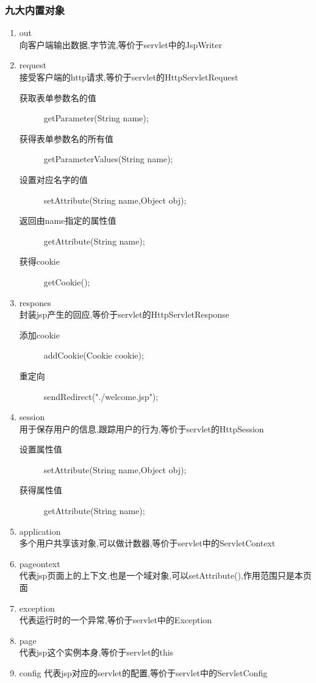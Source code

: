\subsubsection{九大内置对象}
\begin{enumerate}
\item out\\
向客户端输出数据,字节流,等价于servlet中的JspWriter

\item request\\
接受客户端的http请求,等价于servlet的HttpServletRequest
\begin{description}
\item[获取表单参数名的值]	getParameter(String name);
\item[获得表单参数名的所有值]	getParameterValues(String name);
\item[设置对应名字的值]		setAttribute(String name,Object obj);
\item[返回由name指定的属性值]	getAttribute(String name);
\item[获得cookie]	getCookie();
\end{description}

\item respones\\
封装jsp产生的回应,等价于servlet的HttpServletResponse
\begin{description}
\item[添加cookie]	addCookie(Cookie cookie);
\item[重定向]		sendRedirect("./welcome.jsp");
\end{description}


\item session\\
用于保存用户的信息,跟踪用户的行为,等价于servlet的HttpSession
\begin{description}
\item[设置属性值]	setAttribute(String name,Object obj);
\item[获得属性值]	getAttribute(String name);
\end{description}


\item application\\
多个用户共享该对象,可以做计数器,等价于servlet中的ServletContext


\item pageontext\\
代表jsp页面上的上下文,也是一个域对象,可以setAttribute(),作用范围只是本页面


\item exception\\
代表运行时的一个异常,等价于servlet中的Exception


\item page\\
代表jsp这个实例本身,等价于servlet的this


\item config
代表jsp对应的servlet的配置,等价于servlet中的ServletConfig

\end{enumerate}


